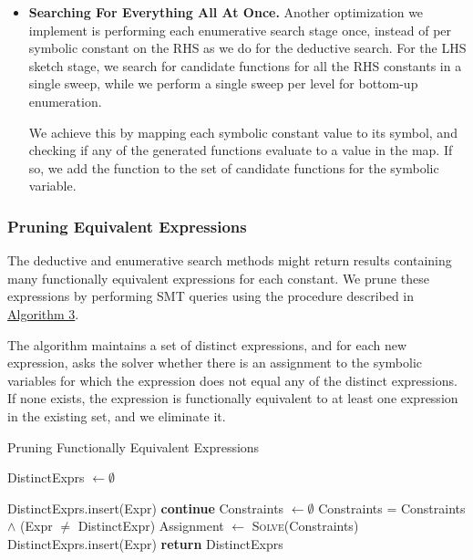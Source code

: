 \documentclass[review, anonymous, acmsmall]{acmart}
\begin{document}
\begin{itemize}
    \item \textbf{Searching For Everything All At Once.} Another optimization we implement is performing each enumerative search stage once, instead of per symbolic constant on the RHS as we do for the deductive search. For the LHS sketch stage, we search for candidate functions for all the RHS constants in a single sweep, while we perform a single sweep per level for bottom-up enumeration. 
    
    We achieve this by mapping each symbolic constant value to its symbol, and checking if any of the generated functions evaluate to a value in the map. If so, we add the function to the set of candidate functions for the symbolic variable. 

\end{itemize}

\subsubsection{Pruning Equivalent Expressions}
\label{sec:prune}
The deductive and enumerative search methods might return results containing many functionally equivalent expressions for each constant. We prune these expressions by performing SMT queries using the procedure described in \hyperref[alg:prune]{Algorithm 3}. 

The algorithm maintains a set of distinct expressions, and for each new expression, asks the solver whether there is an assignment to the symbolic variables for which the expression does not equal any of the distinct expressions. If none exists, the expression is functionally equivalent to at least one expression in the existing set, and we eliminate it.
    
\begin{algorithm}
\caption{Pruning Functionally Equivalent Expressions}\label{alg:prune}
\begin{algorithmic}[1]
\State DistinctExprs $\gets \emptyset$

\State DistinctExprs.insert(Expr)
\State \textbf{continue}
\EndIf
\State Constraints $\gets \emptyset$ 
 
\State Constraints = Constraints $\land$ (Expr $\neq$ DistinctExpr)
\EndFor
\State Assignment $\gets$ \textsc{Solve}(Constraints) 
 
\State DistinctExprs.insert(Expr)
\EndIf
\EndFor
\State \textbf{return} DistinctExprs
\EndProcedure
\end{algorithmic}
\end{algorithm}
\end{document}
